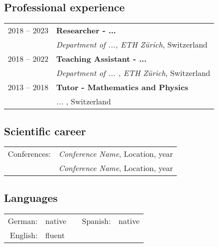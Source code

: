 \subsection*{Professional experience}
\begin{tabular}{ll}
	
	2018 -- 2023 &\textbf{Researcher - ... }\\
                 &\textit{Department of ..., ETH Z\"urich}, Switzerland\\
	
	2018 -- 2022 &\textbf{Teaching Assistant - ...}\\
                 &\textit{Department of ... , ETH Z\"urich}, Switzerland\\
	
	2013 -- 2018 &\textbf{Tutor - Mathematics and Physics}\\
                 &\textit{ ... }, Switzerland\\
	

	
\end{tabular}

\subsection*{Scientific career}
\begin{tabular}{ll}
	
  Conferences: &\textit{Conference Name}, Location, year \\
               &\textit{Conference Name}, Location, year \\
               
\end{tabular}

\subsection*{Languages}
\begin{tabular}{rlcrl}
	
	German:&native&&Spanish:&native\\
	English:&fluent&&&\\
	
\end{tabular}



